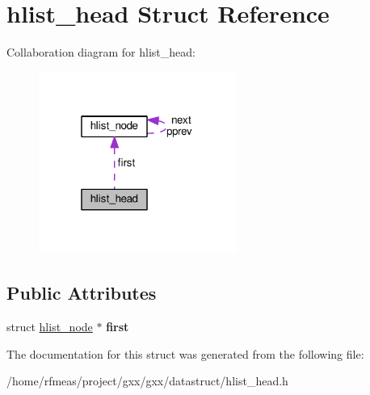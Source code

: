 \hypertarget{structhlist__head}{}\section{hlist\+\_\+head Struct Reference}
\label{structhlist__head}


Collaboration diagram for hlist\+\_\+head\+:
\nopagebreak
\begin{figure}[H]
\begin{center}
\leavevmode
\includegraphics[width=184pt]{structhlist__head__coll__graph}
\end{center}
\end{figure}
\subsection*{Public Attributes}
\begin{DoxyCompactItemize}
\item 
struct \hyperlink{structhlist__node}{hlist\+\_\+node} $\ast$ {\bfseries first}\hypertarget{structhlist__head_a247198a722f93022121b73aee62006bb}{}\label{structhlist__head_a247198a722f93022121b73aee62006bb}

\end{DoxyCompactItemize}


The documentation for this struct was generated from the following file\+:\begin{DoxyCompactItemize}
\item 
/home/rfmeas/project/gxx/gxx/datastruct/hlist\+\_\+head.\+h\end{DoxyCompactItemize}
